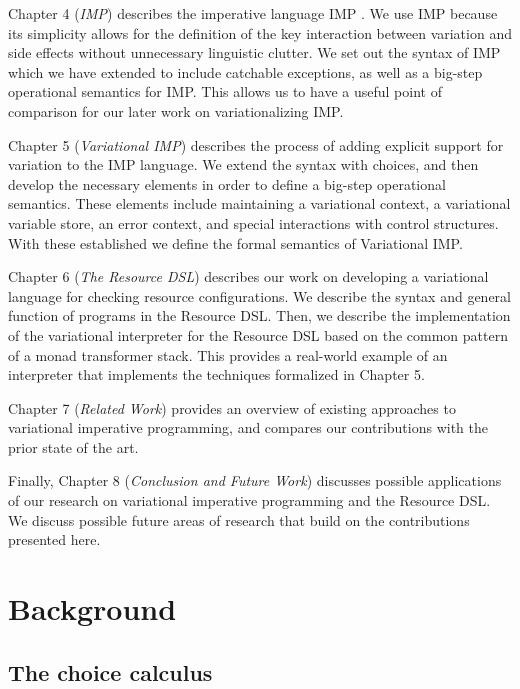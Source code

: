 \documentclass[12pt,oneside]{book}
\begin{document}
Chapter 4 (\emph{IMP}) describes the imperative language IMP \cite{winskel1993formal,nipkow1998winskel,nipkow2014concrete}.
We use IMP because its simplicity allows for the definition of the key
interaction between variation and side effects without unnecessary linguistic
clutter. We set out the syntax of IMP which we have extended to include catchable
exceptions, as well as a big-step operational semantics for IMP. This allows us
to have a useful point of comparison for our later work on variationalizing IMP.

Chapter 5 (\emph{Variational IMP}) describes the process of adding explicit support
for variation to the IMP language. We extend the syntax with choices, and then
develop the necessary elements in order to define a big-step operational semantics.
These elements include maintaining a variational context, a variational variable store,
an error context, and special interactions with control structures. With these established
we define the formal semantics of Variational IMP.

Chapter 6 (\emph{The Resource DSL}) describes our work on developing a variational
language for checking resource configurations. We describe the syntax and general function
of programs in the Resource DSL. Then, we describe the implementation of the variational
interpreter for the Resource DSL based on the common pattern of a monad transformer stack.
This provides a real-world example of an interpreter that implements the techniques formalized
in Chapter 5.

Chapter 7 (\emph{Related Work}) provides an overview of existing approaches to
variational imperative programming, and compares our contributions with the prior
state of the art.

Finally, Chapter 8 (\emph{Conclusion and Future Work}) discusses possible applications
of our research on variational imperative programming and the Resource DSL. We discuss
possible future areas of research that build on the contributions presented here.


\chapter{Background}
\label{ch:bg}

\section{The choice calculus}
\end{document}
